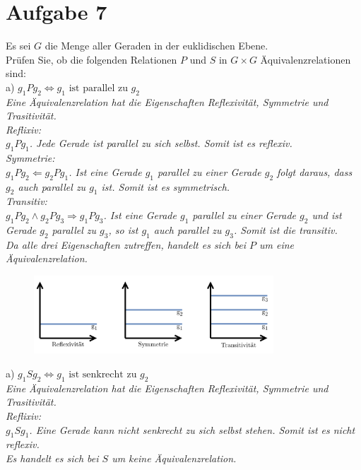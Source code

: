 \section*{Aufgabe 7}

Es sei $G$ die Menge aller Geraden in der euklidischen Ebene.\\
Prüfen Sie, ob die folgenden Relationen $P$ und $S$ in $G \times G$ Äquivalenzrelationen sind:\\

a) $g_1 P g_2 \Leftrightarrow g_1 \text{ ist parallel zu } g_2$\\

\textit{Eine Äquivalenzrelation hat die Eigenschaften Reflexivität, Symmetrie und Trasitivität.}\\

\textit{Reflixiv:}\\
\textit{$g_1Pg_1$. Jede Gerade ist parallel zu sich selbst. Somit ist es reflexiv.}\\

\textit{Symmetrie:}\\
\textit{$g_1Pg_2 \Leftarrow g_2Pg_1$. Ist eine Gerade $g_1$ parallel zu einer Gerade $g_2$ folgt daraus, dass $g_2$ auch parallel zu $g_1$ ist. Somit ist es symmetrisch.}\\

\textit{Transitiv:}\\
\textit{$g_1Pg_2 \land g_2Pg_3 \Rightarrow g_1Pg_3$. Ist eine Gerade $g_1$ parallel zu einer Gerade $g_2$ und ist Gerade $g_2$ parallel zu $g_3$, so ist $g_1$ auch parallel zu $g_3$. Somit ist die transitiv.}\\

\textit{Da alle drei Eigenschaften zutreffen, handelt es sich bei $P$ um eine Äquivalenzrelation.}

\begin{figure}[h]
\centering
\includegraphics[width=0.8\textwidth]{graphics/parallel.png}
\end{figure}

a) $g_1 S g_2 \Leftrightarrow g_1 \text{ ist senkrecht zu } g_2$\\

\textit{Eine Äquivalenzrelation hat die Eigenschaften Reflexivität, Symmetrie und Trasitivität.}\\

\textit{Reflixiv:}\\
\textit{$g_1Sg_1$. Eine Gerade kann nicht senkrecht zu sich selbst stehen. Somit ist es nicht reflexiv.}\\

\textit{Es handelt es sich bei $S$ um keine Äquivalenzrelation.}

